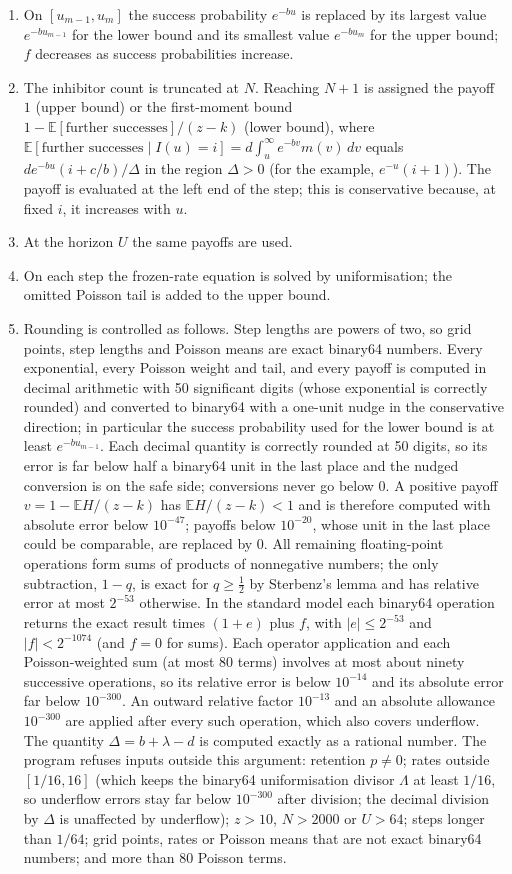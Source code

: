 \documentclass[11pt,a4paper]{article}
\numberwithin{equation}{section}
\theoremstyle{definition}\newtheorem{definition}[theorem]{Definition}
\theoremstyle{remark}\newtheorem{remark}[theorem]{Remark}\newtheorem{example}[theorem]{Example}
\newcommand{\E}{\mathbb E}
\begin{document}
\begin{enumerate}[label=(\roman*)]
\item On $[u_{m-1},u_m]$ the success probability $e^{-bu}$ is replaced by its largest value $e^{-bu_{m-1}}$ for the lower bound and its smallest value $e^{-bu_m}$ for the upper bound; $f$ decreases as success probabilities increase.
\item The inhibitor count is truncated at $N$. Reaching $N+1$ is assigned the payoff $1$ (upper bound) or the first-moment bound $1-\E[\text{further successes}]/(z-k)$ (lower bound), where $\E[\text{further successes}\mid I(u)=i]=d\int_u^\infty e^{-bv}m(v)\,dv$ equals $de^{-bu}(i+c/b)/\Delta$ in the region $\Delta>0$ (for the example, $e^{-u}(i+1)$). The payoff is evaluated at the left end of the step; this is conservative because, at fixed $i$, it increases with $u$.
\item At the horizon $U$ the same payoffs are used.
\item On each step the frozen-rate equation is solved by uniformisation; the omitted Poisson tail is added to the upper bound.
\item Rounding is controlled as follows. Step lengths are powers of two, so grid points, step lengths and Poisson means are exact binary64 numbers. Every exponential, every Poisson weight and tail, and every payoff is computed in decimal arithmetic with 50 significant digits (whose exponential is correctly rounded) and converted to binary64 with a one-unit nudge in the conservative direction; in particular the success probability used for the lower bound is at least $e^{-bu_{m-1}}$. Each decimal quantity is correctly rounded at 50 digits, so its error is far below half a binary64 unit in the last place and the nudged conversion is on the safe side; conversions never go below $0$. A positive payoff $v=1-\E H/(z-k)$ has $\E H/(z-k)<1$ and is therefore computed with absolute error below $10^{-47}$; payoffs below $10^{-20}$, whose unit in the last place could be comparable, are replaced by $0$. All remaining floating-point operations form sums of products of nonnegative numbers; the only subtraction, $1-q$, is exact for $q\ge\frac12$ by Sterbenz's lemma and has relative error at most $2^{-53}$ otherwise. In the standard model each binary64 operation returns the exact result times $(1+e)$ plus $f$, with $|e|\le2^{-53}$ and $|f|<2^{-1074}$ (and $f=0$ for sums). Each operator application and each Poisson-weighted sum (at most $80$ terms) involves at most about ninety successive operations, so its relative error is below $10^{-14}$ and its absolute error far below $10^{-300}$. An outward relative factor $10^{-13}$ and an absolute allowance $10^{-300}$ are applied after every such operation, which also covers underflow. The quantity $\Delta=b+\lambda-d$ is computed exactly as a rational number. The program refuses inputs outside this argument: retention $p\ne0$; rates outside $[1/16,16]$ (which keeps the binary64 uniformisation divisor $\Lambda$ at least $1/16$, so underflow errors stay far below $10^{-300}$ after division; the decimal division by $\Delta$ is unaffected by underflow); $z>10$, $N>2000$ or $U>64$; steps longer than $1/64$; grid points, rates or Poisson means that are not exact binary64 numbers; and more than $80$ Poisson terms.
\end{enumerate}
\end{document}
